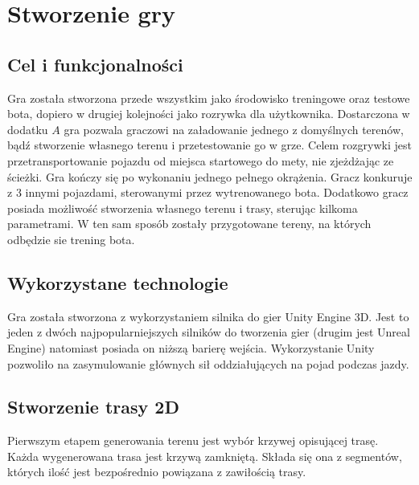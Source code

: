 \chapter{Stworzenie gry}
\thispagestyle{chapterBeginStyle}
\label{rozdzial1}


\section{Cel i funkcjonalności}
Gra została stworzona przede wszystkim jako środowisko treningowe oraz testowe bota, dopiero w drugiej kolejności jako rozrywka dla użytkownika. Dostarczona w dodatku $A$ gra pozwala graczowi na załadowanie jednego z domyślnych terenów, bądź stworzenie własnego terenu i przetestowanie go w grze. Celem rozgrywki jest przetransportowanie pojazdu od miejsca startowego do mety, nie zjeżdżając ze ścieżki. Gra kończy się po wykonaniu jednego pełnego okrążenia. Gracz konkuruje z 3 innymi pojazdami, sterowanymi przez wytrenowanego bota. Dodatkowo gracz posiada możliwość stworzenia własnego terenu i trasy, sterując kilkoma parametrami. W ten sam sposób zostały przygotowane tereny, na których odbędzie sie trening bota.

\section{Wykorzystane technologie}
Gra została stworzona z wykorzystaniem silnika do gier Unity Engine 3D. Jest to jeden z dwóch najpopularniejszych silników do tworzenia gier (drugim jest Unreal Engine) natomiast posiada on niższą barierę wejścia. Wykorzystanie Unity pozwoliło na zasymulowanie głównych sił oddziałujących na pojad podczas jazdy.

\section{Stworzenie trasy 2D}
Pierwszym etapem generowania terenu jest wybór krzywej opisującej trasę. Każda wygenerowana trasa jest krzywą zamkniętą. Składa się ona z segmentów, których ilość jest bezpośrednio powiązana z zawiłością trasy. 

